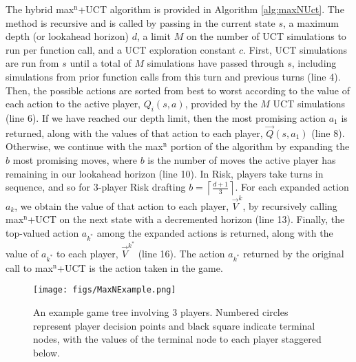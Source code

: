 \documentclass[letterpaper]{article}
\numberwithin{equation}{section}
\numberwithin{theorem}{section}
\numberwithin{lemma}{section}
\numberwithin{df}{section}
\begin{document}
The hybrid max$^\text{n}$+UCT algorithm is provided in Algorithm \ref{alg:maxNUct}.  The method is recursive and is called by passing in the current state $s$, a maximum depth (or lookahead horizon) $d$, a limit $M$ on the number of UCT simulations to run per function call, and a UCT exploration constant $c$.  First, UCT simulations are run from $s$ until a total of $M$ simulations have passed through $s$, including simulations from prior function calls from this turn and previous turns (line 4).  Then, the possible actions are sorted from best to worst according to the value of each action to the active player, $Q_i(s,a)$, provided by the $M$ UCT simulations (line 6).  If we have reached our depth limit, then the most promising action $a_1$ is returned, along with the values of that action to each player, $\vec{Q}(s,a_1)$ (line 8).  Otherwise, we continue with the max$^\text{n}$ portion of the algorithm by expanding the $b$ most promising moves, where $b$ is the number of moves the active player has remaining in our lookahead horizon (line 10).  In Risk, players take turns in sequence, and so for 3-player Risk drafting $b = \left\lceil \frac{d + 1}{3} \right\rceil$.  For each expanded action $a_k$, we obtain the value of that action to each player, $\vec{V}^k$, by recursively calling max$^\text{n}$+UCT on the next state with a decremented horizon (line 13).  Finally, the top-valued action $a_{k^*}$ among the expanded actions is returned, along with the value of $a_{k^*}$ to each player, $\vec{V}^{k^*}$ (line 16).  The action $a_{k^*}$ returned by the original call to max$^\text{n}$+UCT is the action taken in the game.


\begin{figure*}[t]
	\centering
	\texttt{[image: figs/MaxNExample.png]}
	\caption{An example game tree involving 3 players.  Numbered circles represent player decision points and black square indicate terminal nodes, with the values of the terminal node to each player staggered below.}
	\label{fig:MaxNEx}
\end{figure*}
\end{document}
